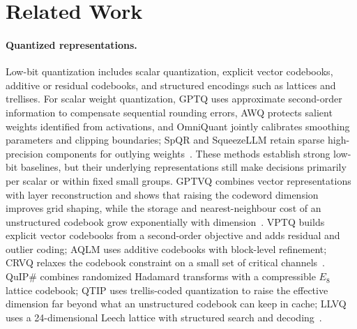 \section{Related Work}

\paragraph{Quantized representations.}
Low-bit quantization includes scalar quantization, explicit vector codebooks, additive or residual codebooks, and structured encodings such as lattices and trellises.
For scalar weight quantization, GPTQ uses approximate second-order information to compensate sequential rounding errors, AWQ protects salient weights identified from activations, and OmniQuant jointly calibrates smoothing parameters and clipping boundaries; SpQR and SqueezeLLM retain sparse high-precision components for outlying weights~\cite{gptq,awq,omniquant,spqr,squeezellm}.
These methods establish strong low-bit baselines, but their underlying representations still make decisions primarily per scalar or within fixed small groups.
GPTVQ combines vector representations with layer reconstruction and shows that raising the codeword dimension improves grid shaping, while the storage and nearest-neighbour cost of an unstructured codebook grow exponentially with dimension~\cite{gptvq}.
VPTQ builds explicit vector codebooks from a second-order objective and adds residual and outlier coding; AQLM uses additive codebooks with block-level refinement; CRVQ relaxes the codebook constraint on a small set of critical channels~\cite{vptq,aqlm,crvq}.
QuIP\# combines randomized Hadamard transforms with a compressible $E_8$ lattice codebook; QTIP uses trellis-coded quantization to raise the effective dimension far beyond what an unstructured codebook can keep in cache; LLVQ uses a 24-dimensional Leech lattice with structured search and decoding~\cite{quipsharp,qtip,llvq}.
